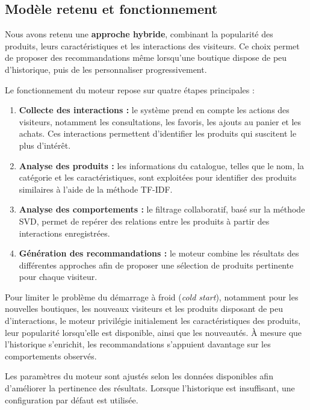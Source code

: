 \subsection{Modèle retenu et fonctionnement}

Nous avons retenu une \textbf{approche hybride}, combinant la popularité des produits, leurs caractéristiques et les interactions des visiteurs. Ce choix permet de proposer des recommandations même lorsqu'une boutique dispose de peu d'historique, puis de les personnaliser progressivement.

Le fonctionnement du moteur repose sur quatre étapes principales :

\begin{enumerate}
    \item \textbf{Collecte des interactions :} le système prend en compte les actions des visiteurs, notamment les consultations, les favoris, les ajouts au panier et les achats. Ces interactions permettent d'identifier les produits qui suscitent le plus d'intérêt.

    \item \textbf{Analyse des produits :} les informations du catalogue, telles que le nom, la catégorie et les caractéristiques, sont exploitées pour identifier des produits similaires à l'aide de la méthode TF-IDF.

    \item \textbf{Analyse des comportements :} le filtrage collaboratif, basé sur la méthode SVD, permet de repérer des relations entre les produits à partir des interactions enregistrées.

    \item \textbf{Génération des recommandations :} le moteur combine les résultats des différentes approches afin de proposer une sélection de produits pertinente pour chaque visiteur.
\end{enumerate}

Pour limiter le problème du démarrage à froid (\textit{cold start}), notamment pour les nouvelles boutiques, les nouveaux visiteurs et les produits disposant de peu d'interactions, le moteur privilégie initialement les caractéristiques des produits, leur popularité lorsqu'elle est disponible, ainsi que les nouveautés. À mesure que l'historique s'enrichit, les recommandations s'appuient davantage sur les comportements observés.

Les paramètres du moteur sont ajustés selon les données disponibles afin d'améliorer la pertinence des résultats. Lorsque l'historique est insuffisant, une configuration par défaut est utilisée.

